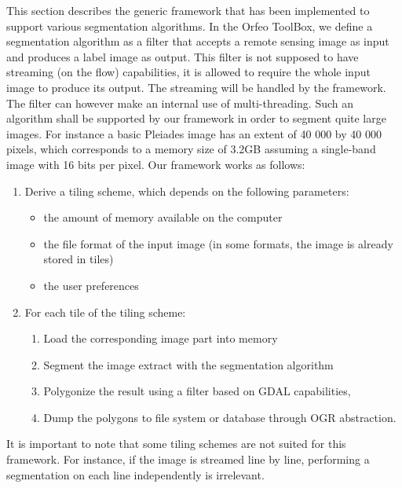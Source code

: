 \documentclass{josis}
\begin{document}
This section describes the generic framework that has been implemented
to support various segmentation algorithms. In the Orfeo ToolBox, we
define a segmentation algorithm as a filter that accepts a remote
sensing image as input and produces a label image as output. This
filter is not supposed to have streaming (on the flow) capabilities,
it is allowed to require the whole input image to produce its
output. The streaming will be handled by the framework. The filter can
however make an internal use of multi-threading.  Such an algorithm
shall be supported by our framework in order to segment quite large
images. For instance a basic Pleiades image \cite{} has an extent of
40 000 by 40 000 pixels, which corresponds to a memory size of 3.2GB
assuming a single-band image with 16 bits per pixel.  Our framework
works as follows:
\begin{enumerate}[1 - ]
\item Derive a tiling scheme, which depends on the following
  parameters:
\begin{itemize}
\item the amount of memory available on the computer
\item the file format of the input image (in some formats,
the image is already stored in tiles)
\item the user preferences
\end{itemize}
\item For each tile of the tiling scheme:
\begin{enumerate}[a - ]
\item Load the corresponding image part into memory
\item Segment the image extract with the segmentation algorithm
\item Polygonize the result using a filter based on GDAL capabilities,
\item Dump the polygons to file system or database through OGR
      abstraction.
\end{enumerate}
\end{enumerate}

It is important to note that some tiling schemes are not suited for
this framework. For instance, if the image is streamed line by line,
performing a segmentation on each line independently is irrelevant.
\end{document}
